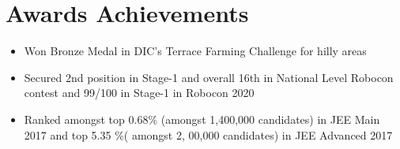 \documentclass[a4paper,11pt]{article}
\begin{document}
\section{Awards Achievements}
\begin{minipage}[t]{\linewidth}
    \begin{itemize}[nosep,after=\strut, leftmargin=1em, itemsep=3pt]
        \item Won Bronze Medal in DIC’s Terrace Farming Challenge for hilly areas
        \item Secured 2nd position in Stage-1 and overall 16th in National Level Robocon contest and 99/100 in Stage-1 in Robocon 2020
        \item  Ranked amongst top 0.68\% (amongst 1,400,000 candidates) in JEE Main 2017 and top 5.35 \%( amongst 2, 00,000 candidates) in JEE Advanced 2017
    \end{itemize}
\end{minipage}

\vfill
{}
\end{document}
